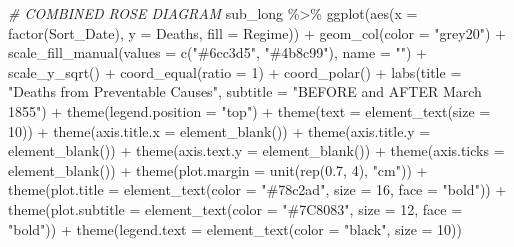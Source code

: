 \documentclass[
  dvipsnames]{article}
\newenvironment{Shaded}{\begin{snugshade}}{\end{snugshade}}
\newcommand{\AttributeTok}[1]{\textcolor[rgb]{0.77,0.63,0.00}{#1}}
\newcommand{\CommentTok}[1]{\textcolor[rgb]{0.56,0.35,0.01}{\textit{#1}}}
\newcommand{\DecValTok}[1]{\textcolor[rgb]{0.00,0.00,0.81}{#1}}
\newcommand{\FloatTok}[1]{\textcolor[rgb]{0.00,0.00,0.81}{#1}}
\newcommand{\FunctionTok}[1]{\textcolor[rgb]{0.00,0.00,0.00}{#1}}
\newcommand{\NormalTok}[1]{#1}
\newcommand{\SpecialCharTok}[1]{\textcolor[rgb]{0.00,0.00,0.00}{#1}}
\newcommand{\StringTok}[1]{\textcolor[rgb]{0.31,0.60,0.02}{#1}}
\begin{document}
\begin{Shaded}
\begin{Highlighting}[]
\CommentTok{\# COMBINED ROSE DIAGRAM}
\NormalTok{sub\_long }\SpecialCharTok{\%\textgreater{}\%}
    \FunctionTok{ggplot}\NormalTok{(}\FunctionTok{aes}\NormalTok{(}\AttributeTok{x =} \FunctionTok{factor}\NormalTok{(Sort\_Date), }\AttributeTok{y =}\NormalTok{ Deaths, }\AttributeTok{fill =}\NormalTok{ Regime)) }\SpecialCharTok{+}
    \FunctionTok{geom\_col}\NormalTok{(}\AttributeTok{color =} \StringTok{"grey20"}\NormalTok{) }\SpecialCharTok{+} \FunctionTok{scale\_fill\_manual}\NormalTok{(}\AttributeTok{values =} \FunctionTok{c}\NormalTok{(}\StringTok{"\#6cc3d5"}\NormalTok{,}
    \StringTok{"\#4b8c99"}\NormalTok{), }\AttributeTok{name =} \StringTok{""}\NormalTok{) }\SpecialCharTok{+} \FunctionTok{scale\_y\_sqrt}\NormalTok{() }\SpecialCharTok{+} \FunctionTok{coord\_equal}\NormalTok{(}\AttributeTok{ratio =} \DecValTok{1}\NormalTok{) }\SpecialCharTok{+}
    \FunctionTok{coord\_polar}\NormalTok{() }\SpecialCharTok{+} \FunctionTok{labs}\NormalTok{(}\AttributeTok{title =} \StringTok{"Deaths from Preventable Causes"}\NormalTok{,}
    \AttributeTok{subtitle =} \StringTok{"BEFORE and AFTER March 1855"}\NormalTok{) }\SpecialCharTok{+} \FunctionTok{theme}\NormalTok{(}\AttributeTok{legend.position =} \StringTok{"top"}\NormalTok{) }\SpecialCharTok{+}
    \FunctionTok{theme}\NormalTok{(}\AttributeTok{text =} \FunctionTok{element\_text}\NormalTok{(}\AttributeTok{size =} \DecValTok{10}\NormalTok{)) }\SpecialCharTok{+} \FunctionTok{theme}\NormalTok{(}\AttributeTok{axis.title.x =} \FunctionTok{element\_blank}\NormalTok{()) }\SpecialCharTok{+}
    \FunctionTok{theme}\NormalTok{(}\AttributeTok{axis.title.y =} \FunctionTok{element\_blank}\NormalTok{()) }\SpecialCharTok{+} \FunctionTok{theme}\NormalTok{(}\AttributeTok{axis.text.y =} \FunctionTok{element\_blank}\NormalTok{()) }\SpecialCharTok{+}
    \FunctionTok{theme}\NormalTok{(}\AttributeTok{axis.ticks =} \FunctionTok{element\_blank}\NormalTok{()) }\SpecialCharTok{+} \FunctionTok{theme}\NormalTok{(}\AttributeTok{plot.margin =} \FunctionTok{unit}\NormalTok{(}\FunctionTok{rep}\NormalTok{(}\FloatTok{0.7}\NormalTok{,}
    \DecValTok{4}\NormalTok{), }\StringTok{"cm"}\NormalTok{)) }\SpecialCharTok{+} \FunctionTok{theme}\NormalTok{(}\AttributeTok{plot.title =} \FunctionTok{element\_text}\NormalTok{(}\AttributeTok{color =} \StringTok{"\#78c2ad"}\NormalTok{,}
    \AttributeTok{size =} \DecValTok{16}\NormalTok{, }\AttributeTok{face =} \StringTok{"bold"}\NormalTok{)) }\SpecialCharTok{+} \FunctionTok{theme}\NormalTok{(}\AttributeTok{plot.subtitle =} \FunctionTok{element\_text}\NormalTok{(}\AttributeTok{color =} \StringTok{"\#7C8083"}\NormalTok{,}
    \AttributeTok{size =} \DecValTok{12}\NormalTok{, }\AttributeTok{face =} \StringTok{"bold"}\NormalTok{)) }\SpecialCharTok{+} \FunctionTok{theme}\NormalTok{(}\AttributeTok{legend.text =} \FunctionTok{element\_text}\NormalTok{(}\AttributeTok{color =} \StringTok{"black"}\NormalTok{,}
    \AttributeTok{size =} \DecValTok{10}\NormalTok{))}
\end{Highlighting}
\end{Shaded}
\end{document}
